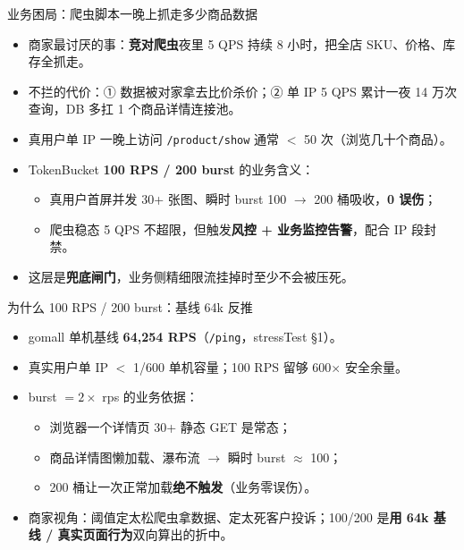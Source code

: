 \documentclass[aspectratio=169,11pt]{beamer}
\begin{document}
\begin{frame}[shrink]{业务困局：爬虫脚本一晚上抓走多少商品数据}
\begin{itemize}
  \item 商家最讨厌的事：\textbf{竞对爬虫}夜里 5 QPS 持续 8 小时，把全店 SKU、价格、库存全抓走。
  \item 不拦的代价：① 数据被对家拿去比价杀价；② 单 IP 5 QPS 累计一夜 14 万次查询，DB 多扛 1 个商品详情连接池。
  \item 真用户单 IP 一晚上访问 \texttt{/product/show} 通常 $<$ 50 次（浏览几十个商品）。
  \item TokenBucket \textbf{100 RPS / 200 burst} 的业务含义：
  \begin{itemize}
    \item 真用户首屏并发 30+ 张图、瞬时 burst 100 $\to$ 200 桶吸收，\textbf{0 误伤}；
    \item 爬虫稳态 5 QPS 不超限，但触发\textbf{风控 + 业务监控告警}，配合 IP 段封禁。
  \end{itemize}
  \item 这层是\textbf{兜底闸门}，业务侧精细限流挂掉时至少不会被压死。
\end{itemize}
\end{frame}

\begin{frame}[shrink]{为什么 100 RPS / 200 burst：基线 64k 反推}
\begin{itemize}
  \item gomall 单机基线 \textbf{64{,}254 RPS}（\texttt{/ping}，stressTest \S 1）。
  \item 真实用户单 IP $<$ 1/600 单机容量；100 RPS 留够 600$\times$ 安全余量。
  \item burst $= 2 \times$ rps 的业务依据：
  \begin{itemize}
    \item 浏览器一个详情页 30+ 静态 GET 是常态；
    \item 商品详情图懒加载、瀑布流 $\to$ 瞬时 burst $\approx$ 100；
    \item 200 桶让一次正常加载\textbf{绝不触发}（业务零误伤）。
  \end{itemize}
  \item 商家视角：阈值定太松爬虫拿数据、定太死客户投诉；100/200 是\textbf{用 64k 基线 / 真实页面行为}双向算出的折中。
\end{itemize}
\end{frame}
\end{document}
